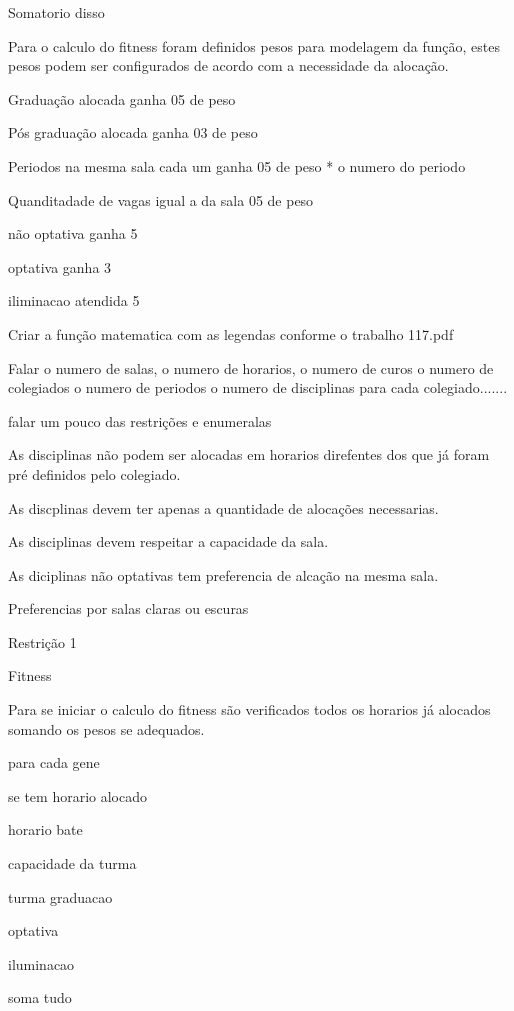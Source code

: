 

Somatorio disso

Para o calculo do fitness foram definidos pesos para modelagem da função, estes pesos podem ser configurados de acordo com a necessidade da alocação.

Graduação alocada ganha 05 de peso

Pós graduação alocada ganha 03 de peso

Periodos na mesma sala cada um ganha 05 de peso * o numero do periodo

Quanditadade de vagas igual a da sala 05 de peso

não optativa ganha 5

optativa ganha 3

iliminacao atendida 5

Criar a função matematica com as legendas conforme o trabalho 117.pdf

Falar o numero de salas, o numero de horarios, o numero de curos o numero de colegiados o numero de periodos o numero de disciplinas para cada colegiado.......



falar um pouco das restrições e enumeralas

As disciplinas não podem ser alocadas em horarios direfentes dos que já foram pré definidos pelo colegiado.

As discplinas devem ter apenas a quantidade de alocações necessarias.

As disciplinas devem respeitar a capacidade da sala.

As diciplinas não optativas tem preferencia de alcação na mesma sala.

Preferencias por salas claras ou escuras

Restrição 1 


Fitness

Para se iniciar o calculo do fitness são verificados todos os horarios já alocados somando os pesos se adequados.

para cada gene

	se tem horario alocado 

		horario bate

		capacidade da turma

		turma graduacao

		optativa

		iluminacao

		soma tudo

